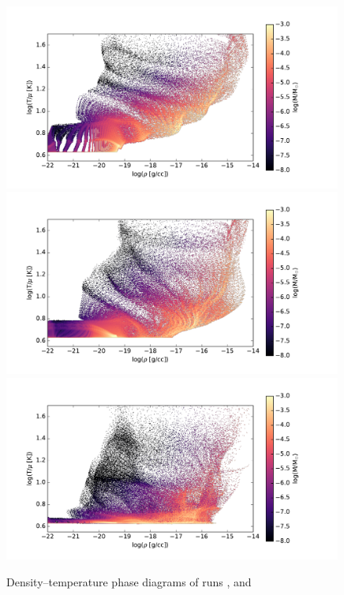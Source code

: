 \begin{figure}[!htb]
 \centering
 \includegraphics[width=0.99\textwidth]{Figures/var_rt_larson_plots/rho_temp_hist_n100c01}
 \includegraphics[width=0.99\textwidth]{Figures/var_rt_larson_plots/rho_temp_hist_n10c01}
 \includegraphics[width=0.99\textwidth]{Figures/var_rt_larson_plots/rho_temp_hist_n1c01}
 \captionsetup{justification=justified,singlelinecheck=false,width=\linewidth}
 \decoRule
 \caption[ $\rho$--T phase diagrams]{Density--temperature phase diagrams of runs ,  and }
\label{fig:c0.1_r_t_larson}
\end{figure}
\FloatBarrier


